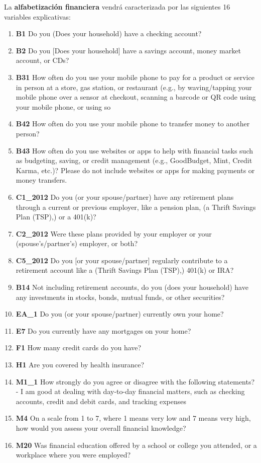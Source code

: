 \documentclass[a4paper, 11pt, bibliography=numbered, es]{article}
\begin{document}
La \textbf{alfabetización financiera} vendrá caracterizada por las siguientes 16 variables explicativas:
\begin{enumerate}
    \item \textbf{B1} Do you (Does your household) have a checking account? 
    \item \textbf{B2} Do you [Does your household] have a savings account, money market account, or CDs?
    \item \textbf{B31} How often do you use your mobile phone to pay for a product or service in person at a store,
    gas station, or restaurant (e.g., by waving/tapping your mobile phone over a sensor at checkout, scanning
    a barcode or QR code using your mobile phone, or using so 
    \item \textbf{B42} How often do you use your mobile phone to transfer money to another person?
    \item \textbf{B43} How often do you use websites or apps to help with financial tasks such as budgeting, saving,
    or credit management (e.g., GoodBudget, Mint, Credit Karma, etc.)? Please do not include websites or 
    apps for making payments or money transfers.
    \item \textbf{C1\_2012} Do you (or your spouse/partner) have any retirement plans through a current or previous 
    employer, like a pension plan, (a Thrift Savings Plan (TSP),) or a 401(k)?
    \item \textbf{C2\_2012} Were these plans provided by your employer or your (spouse's/partner's) employer, or both? 
    \item \textbf{C5\_2012} Do you [or your spouse/partner] regularly contribute to a retirement account like a (Thrift
    Savings Plan (TSP),) 401(k) or IRA?   
    \item \textbf{B14} Not including retirement accounts, do you  (does your household) have any investments in stocks, bonds, mutual funds, or other securities? 
    \item \textbf{EA\_1}  Do you (or your spouse/partner) currently own your home?
    \item \textbf{E7} Do you currently have any mortgages on your home?
    \item \textbf{F1} How many credit cards do you have?  
    \item \textbf{H1}  Are you covered by health insurance?
    \item \textbf{M1\_1} How strongly do you agree or disagree with the following statements? - I am good at dealing with day-to-day financial matters, such as checking accounts, credit and debit cards, and tracking expenses
    \item \textbf{M4} On a scale from 1 to 7, where 1 means very low and 7 means very high, how would you assess your overall financial knowledge?
    \item \textbf{M20} Was financial education offered by a school or college you attended, or a workplace where you were employed?
\end{enumerate}
\end{document}
